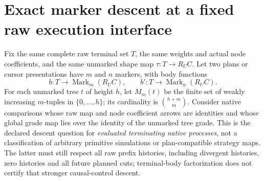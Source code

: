 \documentclass{article}
\begin{document}
\section{Exact marker descent at a fixed raw execution interface}
Fix the same complete raw terminal set $T$, the same weights and actual node
coefficients, and the same unmarked shape map $\tau:T\to R_UC$. Let two plans
or cursor presentations have $m$ and $n$ markers, with body functions
\[
 b:T\to\operatorname{Mark}_m(R_UC),\qquad
 b':T\to\operatorname{Mark}_n(R_UC).
\]
For each unmarked tree $t$ of height $h$, let $M_m(t)$ be the finite set of
weakly increasing $m$-tuples in $\{0,\ldots,h\}$; its cardinality is
$\binom{h+m}{m}$. Consider native comparisons whose raw map and node
coefficient arrows are identities and whose global grade map lies over the
identity of the unmarked tree grade. This is the declared descent question for \emph{evaluated terminating native
processes}, not a classification of arbitrary primitive simulations or
plan-compatible strategy maps. The latter must still respect all raw prefix
histories, including divergent histories, zero histories and all future
planned cuts; terminal-body factorization does not certify that stronger
causal-control descent.
\end{document}
